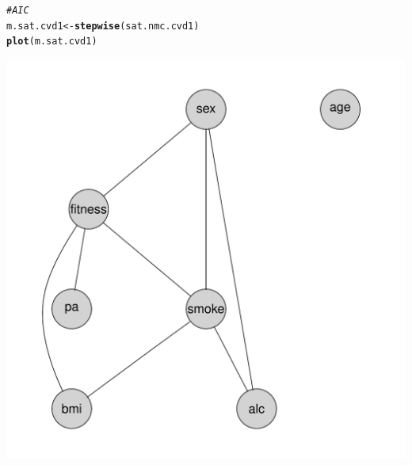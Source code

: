 \documentclass{article}\usepackage[]{graphicx}\usepackage[]{xcolor}
\makeatletter
\def\maxwidth{ %
  \ifdim\Gin@nat@width>\linewidth
    \linewidth
  \else
    \Gin@nat@width
  \fi
}
\newcommand{\hlcom}[1]{\textcolor[rgb]{0.678,0.584,0.686}{\textit{#1}}}%
\newcommand{\hlstd}[1]{\textcolor[rgb]{0.345,0.345,0.345}{#1}}%
\newcommand{\hlkwb}[1]{\textcolor[rgb]{0.69,0.353,0.396}{#1}}%
\newcommand{\hlkwd}[1]{\textcolor[rgb]{0.737,0.353,0.396}{\textbf{#1}}}%
\newenvironment{kframe}{%
 \def\at@end@of@kframe{}%
 \ifinner\ifhmode%
  \def\at@end@of@kframe{\end{minipage}}%
  \begin{minipage}{\columnwidth}%
 \fi\fi%
 \def\FrameCommand##1{\hskip\@totalleftmargin \hskip-\fboxsep
 \colorbox{shadecolor}{##1}\hskip-\fboxsep
     \hskip-\linewidth \hskip-\@totalleftmargin \hskip\columnwidth}%
 \MakeFramed {\advance\hsize-\width
   \@totalleftmargin\z@ \linewidth\hsize
   \@setminipage}}%
 {\par\unskip\endMakeFramed%
 \at@end@of@kframe}
\newenvironment{knitrout}{}{} %
\makeatother
\begin{document}
\begin{knitrout}
\color{fgcolor}\begin{kframe}
\begin{alltt}
\hlcom{#AIC}
\hlstd{m.sat.cvd1} \hlkwb{<-} \hlkwd{stepwise}\hlstd{(sat.nmc.cvd1)}
\hlkwd{plot}\hlstd{(m.sat.cvd1)}
\end{alltt}
\end{kframe}
\includegraphics[width=\maxwidth]{figure/Grafo_AIC_CVD1-1} 
\end{knitrout}
    
\end{document}

